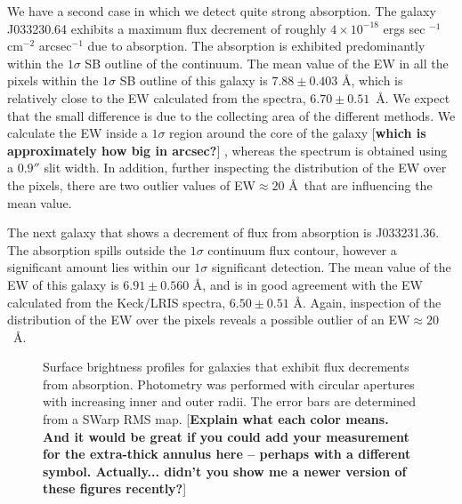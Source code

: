 \documentclass[twocolumn]{aastex6}
\begin{document}
We have a second case in which we detect quite strong absorption. The galaxy J033230.64 exhibits a maximum flux decrement of roughly $4\times10^{-18}$ ergs sec $^{-1}$ cm$^{-2}$ arcsec$^{-1}$ due to  absorption. The absorption is exhibited predominantly within the $1\sigma$ SB outline of the continuum. The mean value of the EW in all the pixels within the $1\sigma$ SB outline of this galaxy is $7.88 \pm 0.403$ \AA, which is relatively close to the EW calculated from the spectra, $6.70 \pm 0.51$\ \AA. We expect that the small difference is due to the collecting area of the different methods. We calculate the EW inside a $1\sigma$ region around the core of the galaxy
[{\bf which is approximately how big in arcsec?}]
, whereas the spectrum is obtained using a $0.9''$ slit width. In addition, further inspecting the distribution of the EW over the pixels, there are two outlier values of EW$\approx 20$ \AA\ that are influencing the mean value.

The next galaxy that shows a decrement of flux from  absorption is J033231.36. The  absorption spills outside the $1\sigma$ continuum flux contour, however a significant amount lies within our $1\sigma$ significant detection. The mean value of the EW of this galaxy is $6.91 \pm 0.560$ \AA, and is in good agreement with the EW calculated from the Keck/LRIS spectra, $6.50 \pm 0.51$ \AA. Again, inspection of the distribution of the EW over the pixels reveals a possible outlier of an EW$\approx 20$\ \AA.


\begin{figure}
\centering
{}
\caption{Surface brightness profiles for galaxies that exhibit flux decrements from  absorption. Photometry was performed with circular apertures with increasing inner and outer radii. The error bars are determined from a SWarp RMS map.
[{\bf Explain what each color means.  And it would be great if you could add your measurement for the extra-thick annulus here -- perhaps with a different symbol.  Actually... didn't you show me a newer version of these figures recently?}]
}
\label{fig:sb_profiles}
\end{figure}
\end{document}
